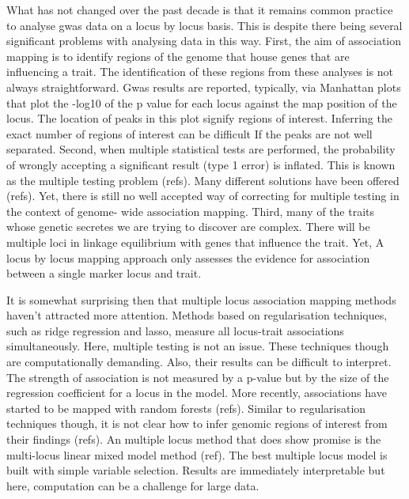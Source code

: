 \documentclass{nature}
\begin{document}
What has not changed over the past decade is that it remains common practice to analyse gwas data on a locus by locus basis. This is despite there being several significant problems with analysing data in this way. First, the aim of association mapping is to identify regions of the genome that house genes that are influencing a trait. The identification of these regions from these analyses is not always straightforward. Gwas results are reported, typically, via Manhattan plots that plot the -log10 of the p value for each locus against the map position of the locus. The location of peaks in this plot signify regions of interest. Inferring the exact number of regions of interest can be difficult If the peaks are not well separated. Second, when multiple statistical tests are performed, the probability of wrongly accepting a significant result (type 1 error) is inflated. This is known as the multiple testing problem (refs). Many different solutions have been offered (refs). Yet, there is still no well accepted way of correcting for multiple testing in the context of genome- wide association mapping. Third, many of the traits whose genetic secretes we are trying to discover are complex. There will be multiple loci in linkage equilibrium with genes that influence the trait. Yet, A locus by locus mapping approach only assesses the evidence for association between a single marker locus and trait.

It is somewhat surprising then that multiple locus association mapping methods haven't attracted more attention. Methods based on 
regularisation techniques, such as ridge regression and lasso, measure all locus-trait associations simultaneously. 
Here, multiple testing is not an issue. These techniques though are computationally demanding. Also, their results can be difficult to interpret. The strength of association is not measured by a p-value but by the size of the regression coefficient for a locus in the model. More recently, associations have started to be mapped with random forests (refs). Similar to regularisation techniques though, it is not clear how to infer genomic regions of interest from their findings (refs). An multiple locus method that does show promise is the multi-locus linear mixed model method (ref). The best multiple locus model is built with simple variable selection. Results are immediately interpretable but here, computation can be a challenge for large data.
\end{document}
